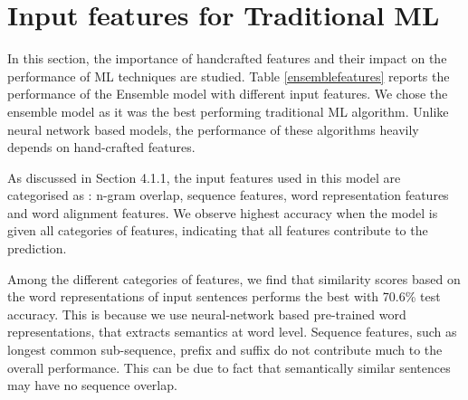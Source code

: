 \documentclass[12pt]{report} %
\begin{document}
%
%
%
%
%
%
%
%

\section{Input features for Traditional ML}
\label{fests}

In this section, the importance of handcrafted features and their impact on the performance of ML techniques are studied. Table \ref{ensemblefeatures} reports the performance of the Ensemble model with different input features. We chose the ensemble model as it was the best performing traditional ML algorithm. Unlike neural network based models, the performance of these algorithms heavily depends on hand-crafted features. 

As discussed in Section 4.1.1, the input features used in this model are categorised as : n-gram overlap, sequence features, word representation features and word alignment features. We observe highest accuracy when the model is given all categories of features, indicating that all features contribute to the prediction.


Among the different categories of features, we find that similarity scores based on the word representations of input sentences performs the best with 70.6\% test accuracy. This is because we use neural-network based pre-trained word representations, that extracts semantics at word level. Sequence features, such as longest common sub-sequence, prefix and suffix do not contribute much to the overall performance. This can be due to fact that semantically similar sentences may have no sequence overlap.
\end{document}
